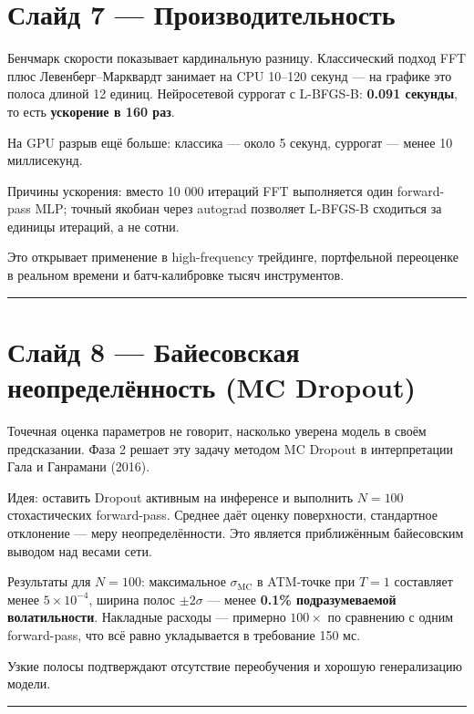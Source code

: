 \documentclass[12pt,a4paper]{article}
\begin{document}
\section*{Слайд 7 — Производительность}

Бенчмарк скорости показывает кардинальную разницу. Классический подход FFT плюс Левенберг–Марквардт занимает на CPU 10–120 секунд — на графике это полоса длиной 12 единиц. Нейросетевой суррогат с L-BFGS-B: \textbf{0.091 секунды}, то есть \textbf{ускорение в 160 раз}.

На GPU разрыв ещё больше: классика — около 5 секунд, суррогат — менее 10 миллисекунд.

Причины ускорения: вместо 10 000 итераций FFT выполняется один forward-pass MLP; точный якобиан через autograd позволяет L-BFGS-B сходиться за единицы итераций, а не сотни.

Это открывает применение в high-frequency трейдинге, портфельной переоценке в реальном времени и батч-калибровке тысяч инструментов.

\vspace{1em}\hrule\vspace{1em}

\section*{Слайд 8 — Байесовская неопределённость (MC Dropout)}

Точечная оценка параметров не говорит, насколько уверена модель в своём предсказании. Фаза 2 решает эту задачу методом MC Dropout в интерпретации Гала и Ганрамани (2016).

Идея: оставить Dropout активным на инференсе и выполнить $N = 100$ стохастических forward-pass. Среднее даёт оценку поверхности, стандартное отклонение — меру неопределённости. Это является приближённым байесовским выводом над весами сети.

Результаты для $N = 100$: максимальное $\sigma_{\text{MC}}$ в ATM-точке при $T = 1$ составляет менее $5 \times 10^{-4}$, ширина полос $\pm 2\sigma$ — менее \textbf{0.1\% подразумеваемой волатильности}. Накладные расходы — примерно $100\times$ по сравнению с одним forward-pass, что всё равно укладывается в требование 150 мс.

Узкие полосы подтверждают отсутствие переобучения и хорошую генерализацию модели.

\vspace{1em}\hrule\vspace{1em}
\end{document}
